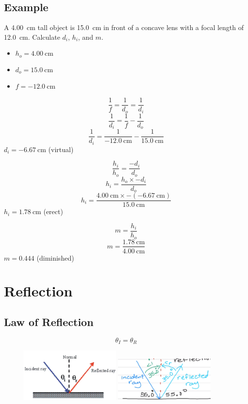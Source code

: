\documentclass[a4paper,12pt]{article}
\begin{document}
\subsection{Example}
A \SI{4.00}{\cm} tall object is \SI{15.0}{\cm} in front of a concave lens with a focal length of \SI{12.0}{\cm}. Calculate $d_i$, $h_i$, and $m$.
\begin{itemize}
    \item{$h_o = \SI{4.00}{\cm}$}
    \item{$d_o = \SI{15.0}{\cm}$}
    \item{$f = \SI{-12.0}{\cm}$}
\end{itemize}

$$\frac{1}{f} = \frac{1}{d_o} = \frac{1}{d_i}$$
$$\frac{1}{d_i} = \frac{1}{f} - \frac{1}{d_o}$$
$$\frac{1}{d_i} = \frac{1}{\SI{-12.0}{\cm}} - \frac{1}{\SI{15.0}{\cm}}$$
$d_i = \SI{-6.67}{\cm}$ (virtual)

$$\frac{h_i}{h_o} = \frac{-d_i}{d_o}$$
$$h_i = \frac{h_o \times -d_i}{d_o}$$
$$h_i = \frac{\SI{4.00}{\cm} \times -(\SI{-6.67}{\cm})}{\SI{15.0}{\cm}}$$
$h_i = \SI{1.78}{\cm}$ (erect)

$$m = \frac{h_i}{h_o}$$
$$m = \frac{\SI{1.78}{\cm}}{\SI{4.00}{\cm}}$$
$m = \num{0.444}$ (diminished)

\pagebreak
\section{Reflection}
\subsection{Law of Reflection}

\Large $$\theta_I = \theta_R$$ \normalsize

\begin{figure}[H]
    \centering
    \includegraphics[width=0.45\textwidth]{reflectangles}
    \includegraphics[width=0.45\textwidth]{reflect}
\end{figure}
\end{document}
